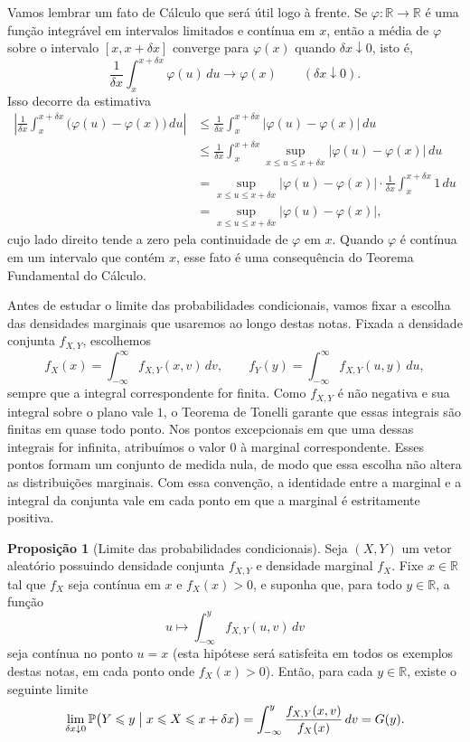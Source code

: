 \documentclass[12pt,portuguese]{article}
\theoremstyle{definition}
\newtheorem{proposition}[proposition]{Proposição}
\theoremstyle{plainexercise}
\theoremstyle{starredexercise}
\theoremstyle{definition}
\begin{document}
Vamos lembrar um fato de Cálculo que será útil logo à frente. Se $\varphi:\mathbb{R}\to\mathbb{R}$
é uma função integrável em intervalos limitados e contínua em $x$, 
então a média de $\varphi$ sobre o intervalo
$[x, x+\delta x]$ converge para $\varphi(x)$ quando $\delta x \downarrow 0$, isto é,
\[
  \frac{1}{\delta x}\int_x^{x+\delta x} \varphi(u)\,du \longrightarrow \varphi(x)
  \qquad (\delta x \downarrow 0).
\]
Isso decorre da estimativa
\begin{align*}
  \left|\frac{1}{\delta x}\int_x^{x+\delta x} \bigl(\varphi(u)-\varphi(x)\bigr)\,du\right|
  &\leqslant 
  \frac{1}{\delta x}\int_x^{x+\delta x} \bigl|\varphi(u)-\varphi(x)\bigr|\,du
  \\[0.3cm]
  &\leqslant 
  \frac{1}{\delta x}\int_x^{x+\delta x} \sup_{x \leqslant u \leqslant x+\delta x} |\varphi(u)-\varphi(x)|\, du
  \\[0.3cm]
  &=
  \sup_{x \leqslant u \leqslant x+\delta x} |\varphi(u)-\varphi(x)|\cdot 
  \frac{1}{\delta x}\int_x^{x+\delta x} 1\, du
  \\[0.3cm]
  &=
  \sup_{x \leqslant u \leqslant x+\delta x} |\varphi(u)-\varphi(x)|,
\end{align*}
cujo lado direito tende a zero pela continuidade de $\varphi$ em $x$. 
Quando $\varphi$ é contínua em um intervalo que contém $x$, 
esse fato é uma consequência do Teorema Fundamental do
Cálculo.

Antes de estudar o limite das probabilidades condicionais, vamos fixar a escolha
das densidades marginais que usaremos ao longo destas notas.
Fixada a densidade conjunta $f_{X,Y}$, escolhemos
\[
  f_X(x)=\int_{-\infty}^{\infty}f_{X,Y}(x,v)\,dv,
  \qquad
  f_Y(y)=\int_{-\infty}^{\infty}f_{X,Y}(u,y)\,du,
\]
sempre que a integral correspondente for finita.
Como $f_{X,Y}$ é não negativa e sua integral sobre o plano vale $1$,
o Teorema de Tonelli garante que essas integrais são finitas em quase todo ponto.
Nos pontos excepcionais em que uma dessas integrais for infinita,
atribuímos o valor $0$ à marginal correspondente.
Esses pontos formam um conjunto de medida nula, de modo que essa escolha
não altera as distribuições marginais.
Com essa convenção, a identidade entre a marginal e a integral da conjunta
vale em cada ponto em que a marginal é estritamente positiva.

\begin{proposition}[Limite das probabilidades condicionais]\label{prop:limite-faixa}
Seja $(X,Y)$ um vetor aleatório possuindo densidade conjunta $f_{X,Y}$ e densidade
marginal $f_X$. Fixe $x \in \mathbb{R}$ tal que $f_X$ seja contínua em $x$ e
$f_X(x) > 0$, e suponha que, para todo $y \in \mathbb{R}$, a função
\[
  u \longmapsto \int_{-\infty}^{y} f_{X,Y}(u,v)\,dv
\]
seja contínua no ponto $u=x$ (esta hipótese será satisfeita em todos os exemplos destas notas, em cada
ponto onde $f_X(x) > 0$). Então, para cada $y \in \mathbb{R}$, existe o seguinte limite
\begin{equation}\label{eq:limite-faixa}
  \lim_{\delta x \downarrow 0}
  \mathbb{P}\bigl(Y \leqslant y \bigm| x \leqslant X \leqslant x+\delta x\bigr)
  = \int_{-\infty}^{y} \frac{f_{X,Y}(x,v)}{f_X(x)}\,dv
  = G(y).
\end{equation}
\end{proposition}
\end{document}

